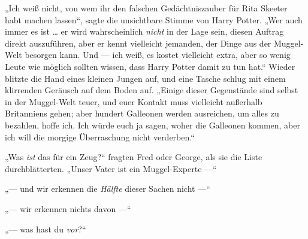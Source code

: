 „Ich weiß nicht, von wem ihr den falschen Gedächtniszauber für Rita Skeeter habt machen lassen“, sagte die unsichtbare Stimme von Harry Potter.
„Wer auch immer es ist … er wird wahrscheinlich \emph{nicht} in der Lage sein, diesen Auftrag direkt auszuführen, aber er kennt vielleicht jemanden, der Dinge aus der Muggel-Welt besorgen kann. Und — ich weiß, es kostet vielleicht extra, aber so wenig Leute wie möglich sollten wissen, dass Harry Potter damit zu tun hat.“
Wieder blitzte die Hand eines kleinen Jungen auf, und eine Tasche schlug mit einem klirrenden Geräusch auf dem Boden auf.
„Einige dieser Gegenstände sind selbst in der Muggel-Welt teuer, und euer Kontakt muss vielleicht außerhalb Britanniens gehen; aber hundert Galleonen werden ausreichen, um alles zu bezahlen, hoffe ich. Ich würde euch ja sagen, woher die Galleonen kommen, aber ich will die morgige Überraschung nicht verderben.“

„Was \emph{ist} das für ein Zeug?“ fragten Fred oder George, als sie die Liste durchblätterten.
„Unser Vater ist ein Muggel-Experte —“

„— und wir erkennen die \emph{Hälfte} dieser Sachen nicht —“

„— wir erkennen nichts davon —“

„— was hast du \emph{vor}?“

